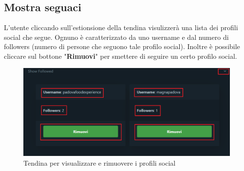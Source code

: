 {    \subsection{Mostra seguaci} {
        L'utente cliccando sull'estionsione della tendina visulizzerà una lista dei profili social che segue. 
        Ognuno è caratterizzato da uno username e dal numero di followers (numero di persone che seguono tale profilo social). 
        Inoltre è possibile cliccare sul bottone "\textbf{Rimuovi}" per smettere di seguire un certo profilo social. 
        \begin{figure}[H]
            \includegraphics[width=14cm]{sezioni/images/tendina-account.png}
            \centering
            \caption{Tendina per visualizzare e rimuovere i profili social}
        \end{figure}
    }

}
